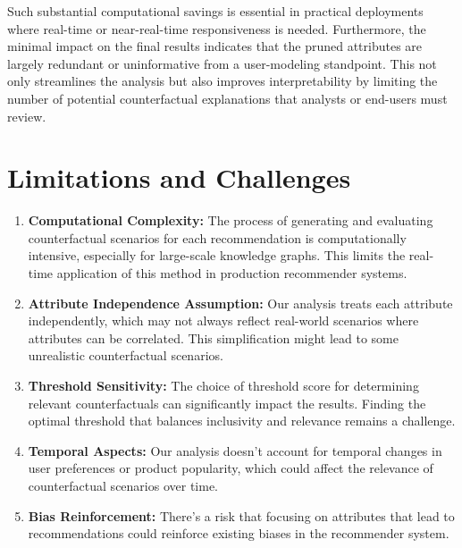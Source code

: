 Such substantial computational savings is essential in practical deployments where
real-time or near-real-time responsiveness is needed. Furthermore, the minimal impact
on the final results indicates that the pruned attributes are largely redundant or
uninformative from a user-modeling standpoint. This not only streamlines the
analysis but also improves interpretability by limiting the number of potential
counterfactual explanations that analysts or end-users must review.



\section{Limitations and Challenges}

\begin{enumerate}
	\item \textbf{Computational Complexity:} The process of generating and
		evaluating counterfactual scenarios for each recommendation is
		computationally intensive, especially for large-scale knowledge graphs. This
		limits the real-time application of this method in production recommender
		systems.

	\item \textbf{Attribute Independence Assumption:} Our analysis treats each
		attribute independently, which may not always reflect real-world scenarios where
		attributes can be correlated. This simplification might lead to some
		unrealistic counterfactual scenarios.

	\item \textbf{Threshold Sensitivity:} The choice of threshold score for
		determining relevant counterfactuals can significantly impact the results. Finding
		the optimal threshold that balances inclusivity and relevance remains a challenge.

	\item \textbf{Temporal Aspects:} Our analysis doesn't account for temporal
		changes in user preferences or product popularity, which could affect the relevance
		of counterfactual scenarios over time.

	\item \textbf{Bias Reinforcement:} There's a risk that focusing on attributes
		that lead to recommendations could reinforce existing biases in the
		recommender system.
\end{enumerate}